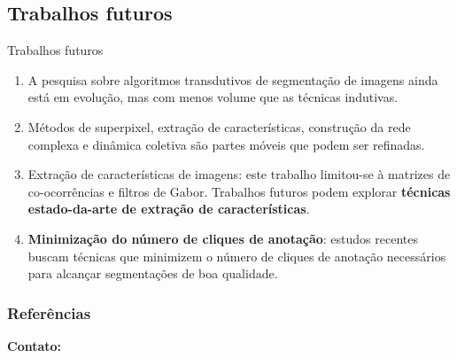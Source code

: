 \documentclass{templatebeamerufc/libs/ufc_format}
\begin{document}
\subsection{Trabalhos futuros}
\begin{frame}{Trabalhos futuros}
  \begin{enumerate}[<+->]
  \item A pesquisa sobre algoritmos transdutivos de segmentação de
imagens ainda está em evolução, mas com menos volume que as técnicas
indutivas.

  \item Métodos de superpixel, extração de características, construção
da rede complexa e dinâmica coletiva são partes móveis que podem ser
refinadas.

  \item Extração de características de imagens: este trabalho
limitou-se à matrizes de co-ocorrências e filtros de Gabor. Trabalhos
futuros podem explorar \textbf{técnicas estado-da-arte de extração de
características}.

\item \textbf{Minimização do número de cliques de anotação}: estudos recentes~\cite{chen2022focalclick}
  buscam técnicas que minimizem o número de cliques de anotação
  necessários para alcançar segmentações de boa qualidade.


  \end{enumerate}
\end{frame}


\begin{frame}[allowframebreaks]
  \frametitle{Referências}
  
\end{frame}

\begin{frame}{}
    \centering
    \huge{\textbf{}}

    \vspace{1cm}

    \Large{\textbf{Contato:}}
    \newline
    \vspace*{0.5cm}
    \large{}
\end{frame}
\end{document}

